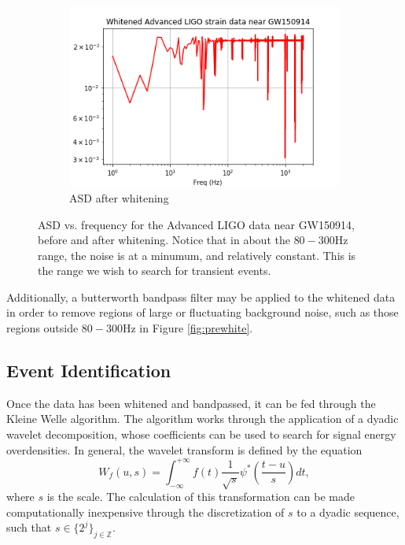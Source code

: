 \documentclass{article}
\begin{document}
\begin{figure}
\begin{subfigure}{\textwidth}
\includegraphics[width=\textwidth]{GW150914_white.png}
\caption{ASD after whitening}
\label{fig:postwhite}
\end{subfigure}
\caption{ASD vs. frequency for the Advanced LIGO data near GW150914, before and after whitening. Notice that in about the $80-300\mathrm{Hz}$ range, the noise is at a minumum, and relatively constant. This is the range we wish to search for transient events.}
\label{fig:asd}
\end{figure}

Additionally, a butterworth bandpass filter may be applied to the whitened data\citep{Blackburn2007}\citep{LIGOScientificCollaboration} in order to remove regions of large or fluctuating background noise, such as those regions outside $80-300\mathrm{Hz}$ in Figure \ref{fig:prewhite}.

\subsection{Event Identification}
Once the data has been whitened and bandpassed, it can be fed through the Kleine Welle algorithm. The algorithm works through the application of a dyadic wavelet decomposition, whose coefficients can be used to search for signal energy overdensities\citep{Biswas2013}\citep{Blackburn2007}. In general, the wavelet transform is defined by the equation\citep{Blackburn2007}\citep{Mallat1999}
\begin{equation}
W_{f}(u,s)=\int_{-\infty}^{+\infty}f(t)\frac{1}{\sqrt{s}}\psi^{*}\left(\frac{t-u}{s}\right)dt, \label{eq:wavtr}
\end{equation}
where $s$ is the scale. The calculation of this transformation can be made computationally inexpensive through the discretization of $s$ to a dyadic sequence, such that $s \in \{2^{j}\}_{j\in\mathbb{Z}}$\citep{Blackburn2007}\citep{Mallat1999}.
\end{document}
